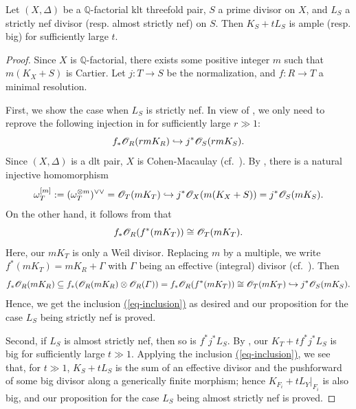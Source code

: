\begin{prop}\label{prop_Q-Goren_surface}
Let $(X,\Delta)$ be a $\mathbb{Q}$-factorial klt threefold pair,  $S$ a prime divisor on $X$, and  $L_S$ a strictly nef  divisor (resp. almost strictly nef) on $S$.
Then $K_S+tL_S$ is ample (resp. big) for sufficiently large $t$.
\end{prop}
\begin{proof}
Since $X$ is $\mathbb{Q}$-factorial, there exists some positive integer $m$ such that $m(K_X+S)$ is Cartier. 
Let $j:T\to S$ be the normalization, and $f:R\to T$  a minimal resolution.

First, we show the case when $L_S$ is strictly nef. 
In view of \cite[Proof of Theorem 2.3]{Ser95}, we only need to reprove the following injection	in \cite[Claim 4 of Proof of Theorem 2.3]{Ser95} for sufficiently large $r\gg 1$:
\begin{equation}\label{eq-inclusion}
f_*\mathscr O_R(rmK_R)\hookrightarrow j^*\mathscr O_S(rmK_S).
\end{equation} %
Since $(X,\Delta)$ is a dlt pair,  $X$ is Cohen-Macaulay (cf.~\cite[Theorems 5.10 and 5.22]{KM98}).
By \cite[Lemma 5-1-9]{KMM87}, there is a natural injective homomorphism
$$\omega_T^{[m]}:=(\omega_T^{\otimes m})^{\vee\vee}=\mathscr O_T(mK_T)\hookrightarrow j^*\mathscr O_X(m(K_X+S))=j^*\mathscr O_S(mK_S).$$
On the other hand, it follows from \cite[Theorem (2.1)]{Sak84} that
$$f_*\mathscr O_R(f^*(mK_T))\cong\mathscr O_T(mK_T).$$
Here, our $mK_T$  is only a Weil divisor. 
Replacing $m$ by a multiple, we write $f^*(mK_T)=mK_R+\Gamma$ with $\Gamma$ being an effective (integral)  divisor (cf.~\cite[(4.1)]{Sak84}).
Then 
$$f_*\mathscr O_R(mK_R)\subseteq f_*(\mathscr O_R(mK_R)\otimes\mathscr O_R(\varGamma))=f_*\mathscr O_R(f^*(mK_T))\cong\mathscr O_T(mK_T)\hookrightarrow j^*\mathscr O_S(mK_S).$$
Hence, we get the inclusion {\hyperref[eq-inclusion]{(\ref*{eq-inclusion})}} as desired and  our proposition for the case $L_S$ being strictly nef is proved. 

Second, if $L_S$ is almost strictly nef, then so is $f^*j^*L_S$.
By \cite[Theorem 26]{Cha20}, our $K_T+tf^*j^*L_S$ is big for sufficiently large $t\gg 1$.
Applying the inclusion {\hyperref[eq-inclusion]{(\ref*{eq-inclusion})}},  we see that,  for $t\gg 1$,  $K_{S}+tL_S$ is the sum of an effective divisor and the pushforward of some big divisor along a generically finite morphism; hence $K_{F_i}+tL_Y|_{F_i}$ is also big, and our proposition for the case $L_S$ being almost strictly nef is proved.
\end{proof}



